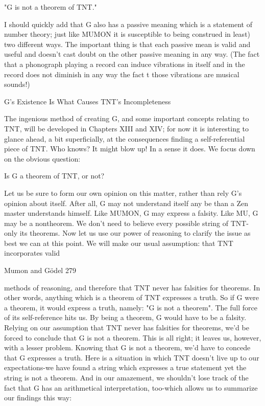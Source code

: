                               "G is not a theorem of TNT."

I should quickly add that G also has a passive meaning which is a statement of number
theory; just like MUMON it is susceptible to being construed in least) two different
ways. The important thing is that each passive mean is valid and useful and doesn't cast
doubt on the other passive meaning in any way. (The fact that a phonograph playing a
record can induce vibrations in itself and in the record does not diminish in any way the
fact t those vibrations are musical sounds!)

                G's Existence Is What Causes TNT's Incompleteness

The ingenious method of creating G, and some important concepts relating to TNT, will
be developed in Chapters XIII and XIV; for now it is interesting to glance ahead, a bit
superficially, at the consequences finding a self-referential piece of TNT. Who knows? It
might blow up! In a sense it does. We focus down on the obvious question:

                             Is G a theorem of TNT, or not?

Let us be sure to form our own opinion on this matter, rather than rely G's opinion about
itself. After all, G may not understand itself any be than a Zen master understands
himself. Like MUMON, G may express a falsity. Like MU, G may be a nontheorem. We
don't need to believe every possible string of TNT-only its theorems. Now let us use our
power of reasoning to clarify the issue as best we can at this point.
        We will make our usual assumption: that TNT incorporates valid




Mumon and Gödel                                                                       279

methods of reasoning, and therefore that TNT never has falsities for theorems. In other
words, anything which is a theorem of TNT expresses a truth. So if G were a theorem, it
would express a truth, namely: "G is not a theorem". The full force of its self-reference
hits us. By being a theorem, G would have to be a falsity. Relying on our assumption that
TNT never has falsities for theorems, we'd be forced to conclude that G is not a theorem.
This is all right; it leaves us, however, with a lesser problem. Knowing that G is not a
theorem, we'd have to concede that G expresses a truth. Here is a situation in which TNT
doesn't live up to our expectations-we have found a string which expresses a true
statement yet the string is not a theorem. And in our amazement, we shouldn't lose track
of the fact that G has an arithmetical interpretation, too-which allows us to summarize
our findings this way:

